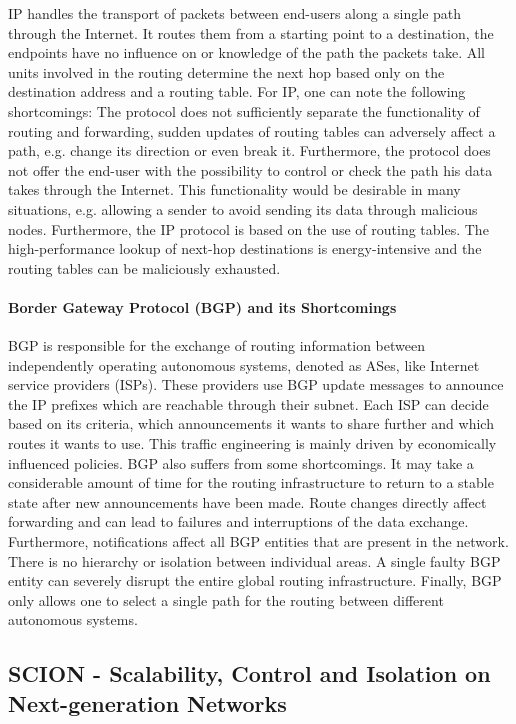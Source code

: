 IP handles the transport of packets between end-users along a single path through the Internet. It routes them from a starting point to a destination, the endpoints have no influence on or knowledge of the path the packets take. All units involved in the routing determine the next hop based only on the destination address and a routing table. For IP, one can note the following shortcomings: The protocol does not sufficiently separate the functionality of routing and forwarding, sudden updates of routing tables can adversely affect a path, e.g. change its direction or even break it. Furthermore, the protocol does not offer the end-user with the possibility to control or check the path his data takes through the Internet. This functionality would be desirable in many situations, e.g. allowing a sender to avoid sending its data through malicious nodes. Furthermore, the IP protocol is based on the use of routing tables. The high-performance lookup of next-hop destinations is energy-intensive and the routing tables can be maliciously exhausted.

\paragraph{Border Gateway Protocol (BGP) and its Shortcomings}

BGP is responsible for the exchange of routing information between independently operating autonomous systems, denoted as ASes, like Internet service providers (ISPs). These providers use BGP update messages to announce the IP prefixes which are reachable through their subnet. Each ISP can decide based on its criteria, which announcements it wants to share further and which routes it wants to use. This traffic engineering is mainly driven by economically influenced policies. BGP also suffers from some shortcomings. It may take a considerable amount of time for the routing infrastructure to return to a stable state after new announcements have been made. Route changes directly affect forwarding and can lead to failures and interruptions of the data exchange. Furthermore, notifications affect all BGP entities that are present in the network. There is no hierarchy or isolation between individual areas. A single faulty BGP entity can severely disrupt the entire global routing infrastructure. Finally, BGP only allows one to select a single path for the routing between different autonomous systems. 

\subsection*{SCION - Scalability, Control and Isolation on Next-generation Networks}


